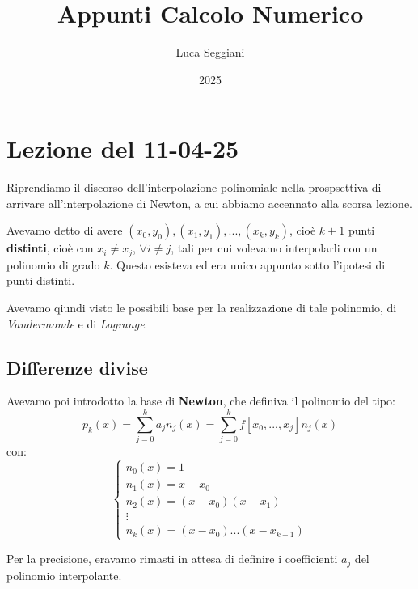 \documentclass[a4paper,11pt]{article}
\title{Appunti Calcolo Numerico}
\author{Luca Seggiani}
\date{2025}
\begin{document}
\section{Lezione del 11-04-25}

\thispagestyle{empty}
\pagestyle{fancy}

Riprendiamo il discorso dell'interpolazione polinomiale nella prospsettiva di arrivare all'interpolazione di Newton, a cui abbiamo accennato alla scorsa lezione.

Avevamo detto di avere $(x_0, y_0), (x_1, y_1), ..., (x_k, y_k)$, cioè $k + 1$ punti \textbf{distinti}, cioè con $x_i \neq x_j$, $\forall i \neq j$, tali per cui volevamo interpolarli con un polinomio di grado $k$.
Questo esisteva ed era unico appunto sotto l'ipotesi di punti distinti.


Avevamo qiundi visto le possibili base per la realizzazione di tale polinomio, di \textit{Vandermonde} e di \textit{Lagrange}.

\subsection{Differenze divise}
Avevamo poi introdotto la base di \textbf{Newton}, che definiva il polinomio del tipo:
$$
p_k (x) = \sum_{j = 0}^k a_j n_j(x) = \sum_{j = 0}^k f [ x_0, ..., x_j ] n_j(x)
$$
con:
\[
	\begin{cases}
			n_0(x) = 1 \\
			n_1(x) = x - x_0 \\
			n_2(x) = (x - x_0)(x - x_1) \\
			\vdots \\
			n_k(x) = (x - x_0) ... (x - x_{k - 1})
	\end{cases}
\]

Per la precisione, eravamo rimasti in attesa di definire i coefficienti $a_j$ del polinomio interpolante.

\par\smallskip
\end{document}
